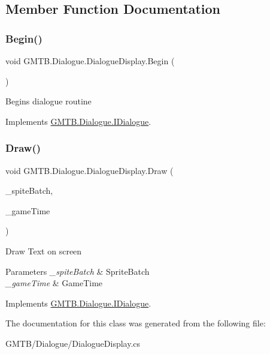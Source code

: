 \subsection{Member Function Documentation}
\mbox{\label{class_g_m_t_b_1_1_dialogue_1_1_dialogue_display_ab9d872cd5375b06f774391852a952a99}} 
\subsubsection{\texorpdfstring{Begin()}{Begin()}}
{\footnotesize\ttfamily void G\+M\+T\+B.\+Dialogue.\+Dialogue\+Display.\+Begin (\begin{DoxyParamCaption}{ }\end{DoxyParamCaption})}



Begins dialogue routine 



Implements \mbox{\hyperlink{interface_g_m_t_b_1_1_dialogue_1_1_i_dialogue}{G\+M\+T\+B.\+Dialogue.\+I\+Dialogue}}.

\mbox{\label{class_g_m_t_b_1_1_dialogue_1_1_dialogue_display_aaab0714aa95f8c01b1b4f817547bfcd1}} 
\subsubsection{\texorpdfstring{Draw()}{Draw()}}
{\footnotesize\ttfamily void G\+M\+T\+B.\+Dialogue.\+Dialogue\+Display.\+Draw (\begin{DoxyParamCaption}\item[{Sprite\+Batch}]{\+\_\+spite\+Batch,  }\item[{Game\+Time}]{\+\_\+game\+Time }\end{DoxyParamCaption})}



Draw Text on screen 


\begin{DoxyParams}{Parameters}
{\em \+\_\+spite\+Batch} & Sprite\+Batch \\
\hline
{\em \+\_\+game\+Time} & Game\+Time \\
\hline
\end{DoxyParams}


Implements \mbox{\hyperlink{interface_g_m_t_b_1_1_dialogue_1_1_i_dialogue}{G\+M\+T\+B.\+Dialogue.\+I\+Dialogue}}.



The documentation for this class was generated from the following file\+:\begin{DoxyCompactItemize}
\item 
G\+M\+T\+B/\+Dialogue/Dialogue\+Display.\+cs\end{DoxyCompactItemize}
